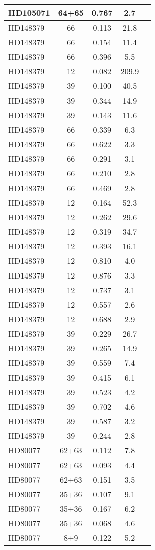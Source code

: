 \begin{table*}
\begin{tabular}{l c c c c}
HD105071 & 64+65 & 0.767 & 2.7\\ 
\hline
HD148379 & 66 & 0.113 & 21.8\\ 
HD148379 & 66 & 0.154 & 11.4\\ 
HD148379 & 66 & 0.396 & 5.5\\ 
HD148379 & 12 & 0.082 & 209.9\\ 
HD148379 & 39 & 0.100 & 40.5\\ 
HD148379 & 39 & 0.344 & 14.9\\ 
HD148379 & 39 & 0.143 & 11.6\\ 
HD148379 & 66 & 0.339 & 6.3\\ 
HD148379 & 66 & 0.622 & 3.3\\ 
HD148379 & 66 & 0.291 & 3.1\\ 
HD148379 & 66 & 0.210 & 2.8\\ 
HD148379 & 66 & 0.469 & 2.8\\ 
HD148379 & 12 & 0.164 & 52.3\\ 
HD148379 & 12 & 0.262 & 29.6\\ 
HD148379 & 12 & 0.319 & 34.7\\ 
HD148379 & 12 & 0.393 & 16.1\\ 
HD148379 & 12 & 0.810 & 4.0\\ 
HD148379 & 12 & 0.876 & 3.3\\ 
HD148379 & 12 & 0.737 & 3.1\\ 
HD148379 & 12 & 0.557 & 2.6\\ 
HD148379 & 12 & 0.688 & 2.9\\ 
HD148379 & 39 & 0.229 & 26.7\\ 
HD148379 & 39 & 0.265 & 14.9\\ 
HD148379 & 39 & 0.559 & 7.4\\ 
HD148379 & 39 & 0.415 & 6.1\\ 
HD148379 & 39 & 0.523 & 4.2\\ 
HD148379 & 39 & 0.702 & 4.6\\ 
HD148379 & 39 & 0.587 & 3.2\\ 
HD148379 & 39 & 0.244 & 2.8\\ 
\hline
HD80077 & 62+63 & 0.112 & 7.8\\ 
HD80077 & 62+63 & 0.093 & 4.4\\ 
HD80077 & 62+63 & 0.151 & 3.5\\ 
HD80077 & 35+36 & 0.107 & 9.1\\ 
HD80077 & 35+36 & 0.167 & 6.2\\ 
HD80077 & 35+36 & 0.068 & 4.6\\ 
HD80077 & 8+9 & 0.122 & 5.2\\ 

\end{tabular}
\end{table*}
